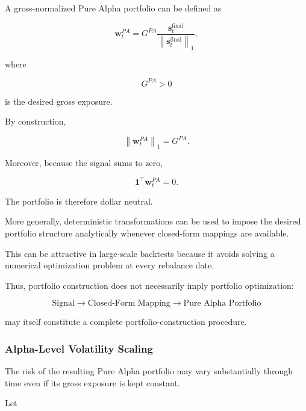 \documentclass[11pt,a4paper]{article}
\begin{document}
A gross-normalized Pure Alpha portfolio can be defined as

\begin{equation}
\boxed{
\mathbf{w}_t^{PA}
=
G^{PA}
\frac{
\mathbf{s}_t^{\mathrm{final}}
}{
\left\|
\mathbf{s}_t^{\mathrm{final}}
\right\|_1
},
}
\end{equation}

where

\begin{equation}
G^{PA}>0
\end{equation}

is the desired gross exposure.

By construction,

\begin{equation}
\left\|
\mathbf{w}_t^{PA}
\right\|_1
=
G^{PA}.
\end{equation}

Moreover, because the signal sums to zero,

\begin{equation}
\mathbf{1}^{\top}
\mathbf{w}_t^{PA}
=
0.
\end{equation}

The portfolio is therefore dollar neutral.

More generally, deterministic transformations can be used to impose the
desired portfolio structure analytically whenever closed-form mappings are
available.

This can be attractive in large-scale backtests because it avoids solving a
numerical optimization problem at every rebalance date.

Thus, portfolio construction does not necessarily imply portfolio
optimization:

\begin{equation}
\boxed{
\text{Signal}
\rightarrow
\text{Closed-Form Mapping}
\rightarrow
\text{Pure Alpha Portfolio}
}
\end{equation}

may itself constitute a complete portfolio-construction procedure.


\subsubsection{Alpha-Level Volatility Scaling}

The risk of the resulting Pure Alpha portfolio may vary substantially through
time even if its gross exposure is kept constant.

Let
\end{document}
